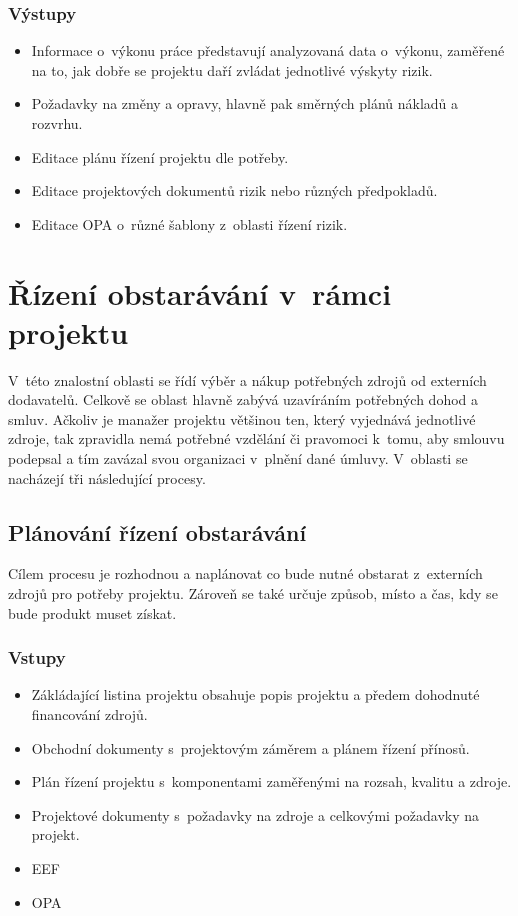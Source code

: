 \subsubsection*{Výstupy}
\begin{itemize}
    \item Informace o~výkonu práce představují analyzovaná data o~výkonu, zaměřené na to, jak dobře se projektu daří zvládat jednotlivé výskyty rizik.
    \item Požadavky na změny a opravy, hlavně pak směrných plánů nákladů a rozvrhu.
    \item Editace plánu řízení projektu dle potřeby.
    \item Editace projektových dokumentů rizik nebo různých předpokladů.
    \item Editace OPA o~různé šablony z~oblasti řízení rizik.
\end{itemize}

\section{Řízení obstarávání v~rámci projektu}
\label{RizeniObstaravani}

V~této znalostní oblasti se řídí výběr a nákup potřebných zdrojů od externích dodavatelů. Celkově se oblast hlavně zabývá uzavíráním potřebných dohod a smluv. Ačkoliv je manažer projektu většinou ten, který vyjednává jednotlivé zdroje, tak zpravidla nemá potřebné vzdělání či pravomoci k~tomu, aby smlouvu podepsal a tím zavázal svou organizaci v~plnění dané úmluvy. V~oblasti se nacházejí tři následující procesy.

\subsection*{Plánování řízení obstarávání}

Cílem procesu je rozhodnou a naplánovat co bude nutné obstarat z~externích zdrojů pro potřeby projektu. Zároveň se také určuje způsob, místo a čas, kdy se bude produkt muset získat. 

\subsubsection*{Vstupy}
\begin{itemize}
    \item Zákládající listina projektu obsahuje popis projektu a předem dohodnuté financování zdrojů.
    \item Obchodní dokumenty s~projektovým záměrem a plánem řízení přínosů.
    \item Plán řízení projektu s~komponentami zaměřenými na rozsah, kvalitu a zdroje.
    \item Projektové dokumenty s~požadavky na zdroje a celkovými požadavky na projekt.
    \item EEF
    \item OPA
\end{itemize}
